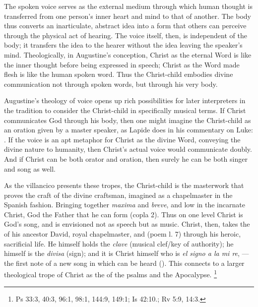 The spoken voice serves as the external medium through which human thought is
transferred from one person's inner heart and mind to that of another.
The body thus converts an inarticulate, abstract idea into a form that others
can perceive through the physical act of hearing.
The voice itself, then, is independent of the body; it transfers the idea to the
hearer without the idea leaving the speaker's mind.
Theologically, in Augustine's conception, Christ as the eternal Word is like the
inner thought before being expressed in speech; Christ as the Word made flesh is
like the human spoken word.
Thus the Christ-child embodies divine communication not through spoken words,
but through his very body.

Augustine's theology of voice opens up rich possibilities for later interpreters
in the tradition to consider the Christ-child in specifically musical terms.
If Christ communicates God through his body, then one might imagine the
Christ-child as an oration given by a master speaker, as Lapide does in his
commentary on Luke:
.%
    \Autocite
    [673, on Lk 2: .] 
    {Lapide:Gospels19C} 
If the voice is an apt metaphor for Christ as the divine Word, conveying the
divine nature to humanity, then Christ's actual voice would communicate doubly.
And if Christ can be both orator and oration, then surely he can be both singer
and song as well.

As the villancico  presents these tropes, the
Christ-child is the masterwork that proves the craft of the divine craftsman,
imagined as a chapelmaster in the Spanish fashion.
Bringing together \emph{maxima} and \emph{breve},  and low in the
incarnate Christ, God the Father  that he can form
 (copla 2).
Thus on one level Christ is God's song, and  is envisioned not
as speech but as music.
Christ, then, takes the  of his ancestor David, royal
chapelmaster, and  (poem l. 7) through his heroic,
sacrificial life.
He himself holds the \emph{clave} (musical clef/key of authority); he himself is
the \emph{divisa} (sign); and it is Christ himself who is \emph{el signo a la mi
re}, ---the first note of a new song in which can be heard
 ().
This connects to a larger theological trope of Christ as the 
of the psalms and the Apocalypse.%
    \footnote{Ps 33:3, 40:3, 96:1, 98:1, 144:9, 149:1; Is 42:10.; Rv 5:9, 14:3.}

